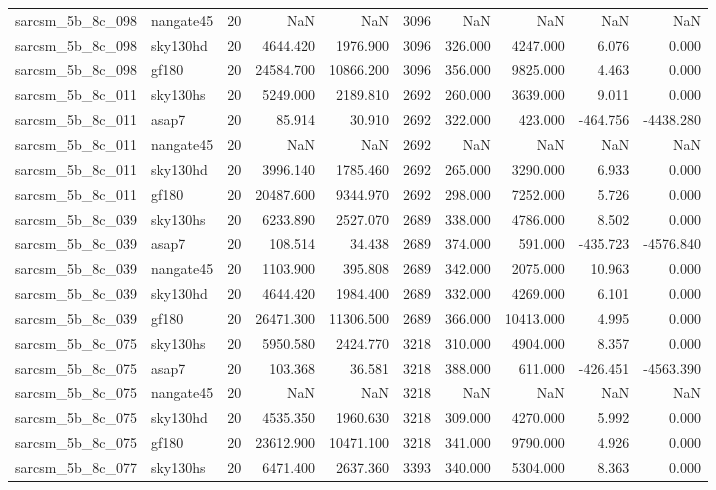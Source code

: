 \documentclass{article}
\begin{document}
\begin{longtable}{llrrrrrrrr}
sarcsm\_5b\_8c\_098 & nangate45 & 20 & NaN & NaN & 3096 & NaN & NaN & NaN & NaN \\
sarcsm\_5b\_8c\_098 & sky130hd & 20 & 4644.420 & 1976.900 & 3096 & 326.000 & 4247.000 & 6.076 & 0.000 \\
sarcsm\_5b\_8c\_098 & gf180 & 20 & 24584.700 & 10866.200 & 3096 & 356.000 & 9825.000 & 4.463 & 0.000 \\
sarcsm\_5b\_8c\_011 & sky130hs & 20 & 5249.000 & 2189.810 & 2692 & 260.000 & 3639.000 & 9.011 & 0.000 \\
sarcsm\_5b\_8c\_011 & asap7 & 20 & 85.914 & 30.910 & 2692 & 322.000 & 423.000 & -464.756 & -4438.280 \\
sarcsm\_5b\_8c\_011 & nangate45 & 20 & NaN & NaN & 2692 & NaN & NaN & NaN & NaN \\
sarcsm\_5b\_8c\_011 & sky130hd & 20 & 3996.140 & 1785.460 & 2692 & 265.000 & 3290.000 & 6.933 & 0.000 \\
sarcsm\_5b\_8c\_011 & gf180 & 20 & 20487.600 & 9344.970 & 2692 & 298.000 & 7252.000 & 5.726 & 0.000 \\
sarcsm\_5b\_8c\_039 & sky130hs & 20 & 6233.890 & 2527.070 & 2689 & 338.000 & 4786.000 & 8.502 & 0.000 \\
sarcsm\_5b\_8c\_039 & asap7 & 20 & 108.514 & 34.438 & 2689 & 374.000 & 591.000 & -435.723 & -4576.840 \\
sarcsm\_5b\_8c\_039 & nangate45 & 20 & 1103.900 & 395.808 & 2689 & 342.000 & 2075.000 & 10.963 & 0.000 \\
sarcsm\_5b\_8c\_039 & sky130hd & 20 & 4644.420 & 1984.400 & 2689 & 332.000 & 4269.000 & 6.101 & 0.000 \\
sarcsm\_5b\_8c\_039 & gf180 & 20 & 26471.300 & 11306.500 & 2689 & 366.000 & 10413.000 & 4.995 & 0.000 \\
sarcsm\_5b\_8c\_075 & sky130hs & 20 & 5950.580 & 2424.770 & 3218 & 310.000 & 4904.000 & 8.357 & 0.000 \\
sarcsm\_5b\_8c\_075 & asap7 & 20 & 103.368 & 36.581 & 3218 & 388.000 & 611.000 & -426.451 & -4563.390 \\
sarcsm\_5b\_8c\_075 & nangate45 & 20 & NaN & NaN & 3218 & NaN & NaN & NaN & NaN \\
sarcsm\_5b\_8c\_075 & sky130hd & 20 & 4535.350 & 1960.630 & 3218 & 309.000 & 4270.000 & 5.992 & 0.000 \\
sarcsm\_5b\_8c\_075 & gf180 & 20 & 23612.900 & 10471.100 & 3218 & 341.000 & 9790.000 & 4.926 & 0.000 \\
sarcsm\_5b\_8c\_077 & sky130hs & 20 & 6471.400 & 2637.360 & 3393 & 340.000 & 5304.000 & 8.363 & 0.000 \\

\end{longtable}
\end{document}
